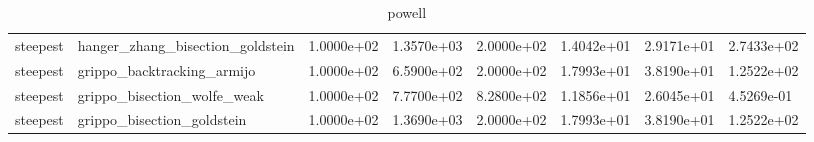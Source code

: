 \documentclass[a4paper,11pt]{article}
\numberwithin{equation}{section} %
\begin{document}
\begin{table}[h!]
{\begin{tabular}{|l|l|l|l|l|l|l|l|}
        steepest & hanger\_zhang\_bisection\_goldstein & 1.0000e+02 & 1.3570e+03 & 2.0000e+02 & 1.4042e+01 & 2.9171e+01 & 2.7433e+02 \\
        steepest & grippo\_backtracking\_armijo & 1.0000e+02 & 6.5900e+02 & 2.0000e+02 & 1.7993e+01 & 3.8190e+01 & 1.2522e+02 \\
        steepest & grippo\_bisection\_wolfe\_weak & 1.0000e+02 & 7.7700e+02 & 8.2800e+02 & 1.1856e+01 & 2.6045e+01 & 4.5269e-01 \\
        steepest & grippo\_bisection\_goldstein & 1.0000e+02 & 1.3690e+03 & 2.0000e+02 & 1.7993e+01 & 3.8190e+01 & 1.2522e+02 \\

\end{tabular}}
\caption{powell}
\label{table:powell}
\end{table}
\end{document}

